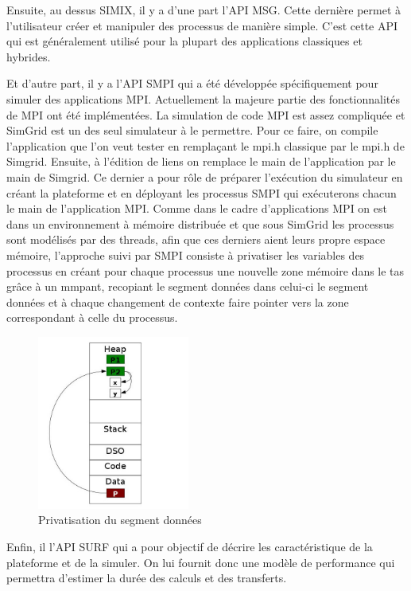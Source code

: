 \documentclass[smallextended]{svjour3}
\begin{document}
Ensuite, au dessus SIMIX, il y a d'une part l'API MSG. Cette dernière
permet à l'utilisateur créer et manipuler des processus de manière
simple. C'est cette API qui est généralement utilisé pour la
plupart des applications classiques et hybrides. 

Et d'autre part, il y a l'API SMPI qui a été développée
spécifiquement pour simuler des applications MPI. Actuellement la
majeure partie des fonctionnalités de MPI ont été implémentées. La
simulation de code MPI est assez compliquée et SimGrid est un des
seul simulateur à le permettre. Pour ce faire, on compile
l'application que l'on veut tester en remplaçant le mpi.h classique
par le mpi.h de Simgrid. Ensuite, à l'édition de liens on remplace
le main de l'application par le main de Simgrid. Ce dernier a pour
rôle de préparer l'exécution du simulateur en créant la plateforme
et en déployant les processus SMPI qui exécuterons chacun le main
de l'application MPI. Comme dans le cadre d'applications MPI on est
dans un environnement à mémoire distribuée et que sous SimGrid les
processus sont modélisés par des threads, afin que ces derniers
aient leurs propre espace mémoire, l'approche suivi par SMPI
consiste à privatiser les variables des processus en créant pour
chaque processus une nouvelle zone mémoire dans le tas grâce à un
mmpant, recopiant le segment données dans celui-ci le segment
données et à chaque changement de contexte faire pointer vers la
zone correspondant à celle du processus. 

\begin{figure}[htb]
\centering
\includegraphics[width=5cm]{./Img/Memoire.jpg}
\caption{\label{fig:1}Privatisation du segment données}
\end{figure}

Enfin, il l'API SURF qui a pour objectif de décrire les
caractéristique de la plateforme et de la simuler. On lui fournit
donc une modèle de performance qui permettra d'estimer la durée des
calculs et des transferts.
\end{document}
